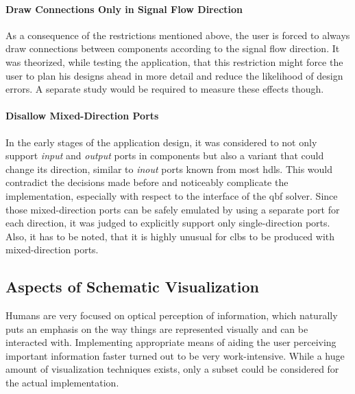	\paragraph{Draw Connections Only in Signal Flow Direction}
		As a consequence of the restrictions mentioned above, the user is forced to always draw connections between components according to the signal flow direction.
		It was theorized, while testing the application, that this restriction might force the user to plan his designs ahead in more detail and reduce the likelihood of design errors.
		A separate study would be required to measure these effects though.
	
	\paragraph{Disallow Mixed-Direction Ports}
		In the early stages of the application design, it was considered to not only support \emph{input} and \emph{output} ports in components but also a variant that could change its direction, similar to \emph{inout} ports known from most \glspl{hdl}.
		This would contradict the decisions made before and noticeably complicate the implementation, especially with respect to the interface of the \gls{qbf} solver.
		Since those mixed-direction ports can be safely emulated by using a separate port for each direction, it was judged to explicitly support only single-direction ports.
		Also, it has to be noted, that it is highly unusual for \glspl{clb} to be produced with mixed-direction ports.

\subsection{Aspects of Schematic Visualization}
	\label{sec-visualization-aspects}
	Humans are very focused on optical perception of information, which naturally puts an emphasis on the way things are represented visually and can be interacted with.
	Implementing appropriate means of aiding the user perceiving important information faster turned out to be very work-intensive. 
	While a huge amount of visualization techniques exists,
	only a subset could be considered for the actual implementation\cite{InteraktiveSysteme}. 
	
